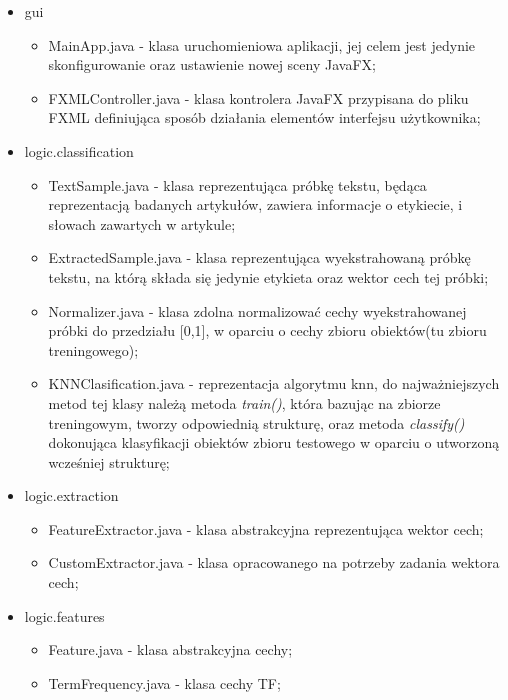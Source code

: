 \documentclass{classrep}
\begin{document}
\begin{itemize}
	\item gui
	\begin{itemize}
		\item MainApp.java - klasa uruchomieniowa aplikacji, jej celem jest jedynie skonfigurowanie oraz ustawienie nowej sceny JavaFX;
		\item FXMLController.java - klasa kontrolera JavaFX przypisana do pliku FXML definiująca sposób działania elementów interfejsu użytkownika;
	\end{itemize}
	\item logic.classification
	\begin{itemize}
		\item TextSample.java - klasa reprezentująca próbkę tekstu, będąca reprezentacją badanych artykułów, zawiera informacje o etykiecie, i słowach zawartych w artykule;
		\item ExtractedSample.java - klasa reprezentująca wyekstrahowaną próbkę tekstu, na którą składa się jedynie etykieta oraz wektor cech tej próbki;
		\item Normalizer.java - klasa zdolna normalizować cechy wyekstrahowanej próbki do przedziału [0,1], w oparciu o cechy zbioru obiektów(tu zbioru treningowego);
		\item KNNClasification.java - reprezentacja algorytmu knn, do najważniejszych metod tej klasy należą metoda \textit{train()}, która bazując na zbiorze treningowym, tworzy odpowiednią strukturę, oraz metoda \textit{classify()} dokonująca klasyfikacji obiektów zbioru testowego w oparciu o utworzoną wcześniej strukturę;
	\end{itemize}
	\item logic.extraction
	\begin{itemize}
		\item FeatureExtractor.java - klasa abstrakcyjna reprezentująca wektor cech;

		\item CustomExtractor.java - klasa opracowanego na potrzeby zadania wektora cech;
	\end{itemize}
	\item logic.features
	\begin{itemize}
		\item Feature.java - klasa abstrakcyjna cechy;
		\item TermFrequency.java - klasa cechy TF;

\end{itemize}
\end{itemize}
\end{document}
